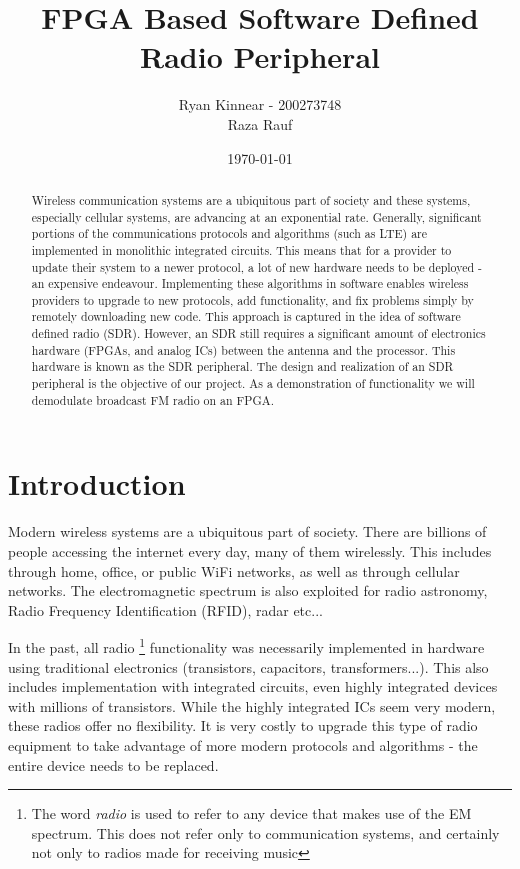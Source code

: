 \documentclass[a4paper, 12pt, notitlepage]{article}
\author{Ryan Kinnear - 200273748 \\ Raza Rauf}
\title{FPGA Based Software Defined Radio Peripheral}
\date{\today}
\begin{document}
\maketitle

\begin{abstract}
Wireless communication systems are a ubiquitous part of society and these systems, especially cellular systems, are advancing at an exponential rate.  Generally, significant portions of the communications protocols and algorithms (such as LTE) are implemented in monolithic integrated circuits.  This means that for a provider to update their system to a newer protocol, a lot of new hardware needs to be deployed - an expensive endeavour.  Implementing these algorithms in software enables wireless providers to upgrade to new protocols, add functionality, and fix problems simply by remotely downloading new code.  This approach is captured in the idea of software defined radio (SDR).  However, an SDR still requires a significant amount of electronics hardware (FPGAs, and analog ICs) between the antenna and the processor.  This hardware is known as the SDR peripheral.  The design and realization of an SDR peripheral is the objective of our project.  As a demonstration of functionality we will demodulate broadcast FM radio on an FPGA.
\end{abstract}

\newpage
\tableofcontents
\newpage
\listoffigures
\newpage

\section{Introduction}
\label{sec:intro}
Modern wireless systems are a ubiquitous part of society.  There are billions of people accessing the internet every day, many of them wirelessly.  This includes through home, office, or public WiFi networks, as well as through cellular networks.  The electromagnetic spectrum is also exploited for radio astronomy, Radio Frequency Identification (RFID), radar etc...  

In the past, all radio \footnote{The word \textit{radio} is used to refer to any device that makes use of the EM spectrum.  This does not refer only to communication systems, and certainly not only to radios made for receiving music} functionality was necessarily implemented in hardware using traditional electronics (transistors, capacitors, transformers...).  This also includes implementation with integrated circuits, even highly integrated devices with millions of transistors.  While the highly integrated ICs seem very modern, these radios offer no flexibility.  It is very costly to upgrade this type of radio equipment to take advantage of more modern protocols and algorithms - the entire device needs to be replaced.
\end{document}

